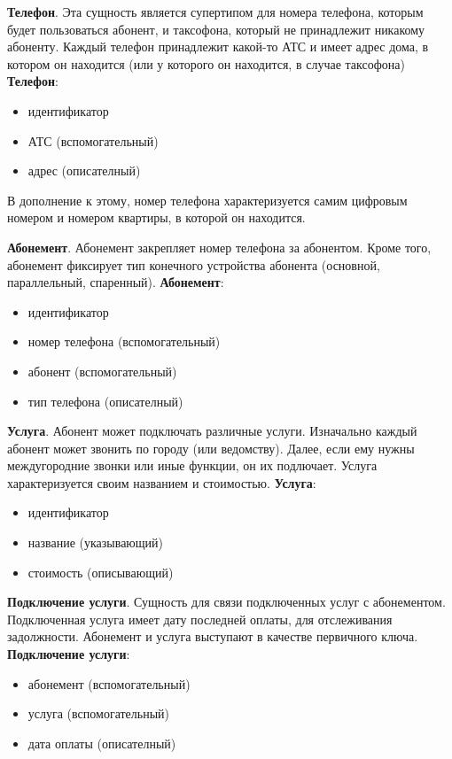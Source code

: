 \documentclass{report}
\begin{document}
\textbf{Телефон}. Эта сущность является супертипом для номера телефона, 
которым будет пользоваться абонент, и таксофона, который не принадлежит
никакому абоненту. Каждый телефон принадлежит какой-то АТС и имеет адрес дома,
в котором он находится (или у которого он находится, в случае таксофона)
\newline\textbf{Телефон}:
\begin{itemize}
    \item идентификатор
    \item АТС (вспомогательный)
    \item адрес (описателный)
\end{itemize}
В дополнение к этому, номер телефона характеризуется 
самим цифровым номером и номером квартиры, в которой он находится. 

\textbf{Абонемент}. Абонемент закрепляет номер телефона за абонентом.
Кроме того, абонемент фиксирует тип конечного 
устройства абонента (основной, параллельный, спаренный). 
\newline\textbf{Абонемент}:
\begin{itemize}
    \item идентификатор
    \item номер телефона (вспомогательный)
    \item абонент (вспомогательный)
    \item тип телефона (описателный)
\end{itemize}

\textbf{Услуга}. Абонент может подключать различные услуги. Изначально 
каждый абонент может звонить по городу (или ведомству). Далее, если 
ему нужны междугородние звонки или иные функции, он их подлючает. Услуга
характеризуется своим названием и стоимостью.
\newline\textbf{Услуга}:
\begin{itemize}
    \item идентификатор
    \item название (указывающий)
    \item стоимость (описывающий)
\end{itemize}

\textbf{Подключение услуги}. Сущность для связи подключенных услуг с 
абонементом. Подключенная услуга имеет дату последней оплаты, для отслеживания
задолжности. Абонемент и услуга выступают в качестве первичного ключа.
\newline\textbf{Подключение услуги}:
\begin{itemize}
    \item абонемент (вспомогательный)
    \item услуга (вспомогательный)
    \item дата оплаты (описателный)
\end{itemize}
\end{document}
